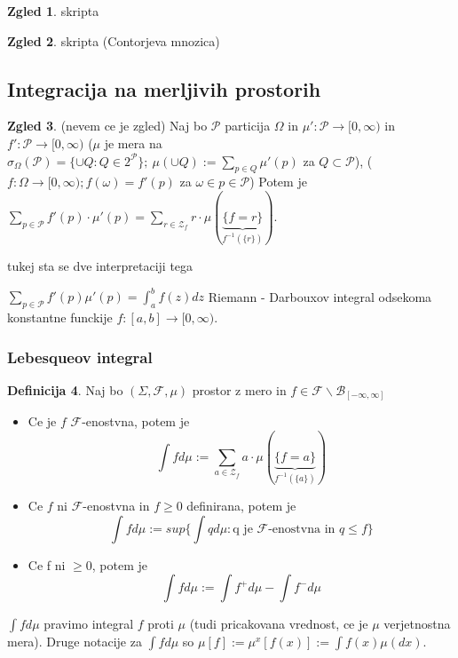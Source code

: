 \documentclass[a4paper,12pt]{article}
\theoremstyle{definition} %
\newtheorem{definicija}{Definicija}[section]
\newtheorem{zgled}[definicija]{Zgled}
\theoremstyle{plain} %
\newcommand{\F}{\mathcal{F}}
\begin{document}
            \begin{zgled}
                skripta
            \end{zgled}

            \begin{zgled}
                skripta (Contorjeva mnozica)
            \end{zgled}

    \subsection{Integracija na merljivih prostorih}
        \begin{zgled}(nevem ce je zgled)
            Naj bo $\mathcal{P}$ particija $\Omega$ in $\mu':\mathcal{P} \rightarrow [0, \infty)$ in
            $f':\mathcal{P} \rightarrow [0, \infty)$ ($\mu$ je mera na $\sigma_\Omega(\mathcal{P})=\{\cup Q: Q \in 2^{\mathcal{P}}\}; \ 
            \mu(\cup Q):= \sum_{p \in Q}\mu'(p)$ za $Q \subset \mathcal{P}$), ($f:\Omega \rightarrow [0, \infty); f(\omega) = f'(p)$ za $\omega \in p \in \mathcal{P}$)
            Potem je $\sum_{p \in \mathcal{P}}f'(p)\cdot\mu'(p) = \sum_{r \in \mathcal{Z}_f}r\cdot\mu(\underbrace{\{f = r\}}_{f^{-1}(\{r\})})$.

            tukej sta se dve interpretaciji tega
        \end{zgled}

        $\sum_{p \in \mathcal{P}}f'(p)\mu'(p) = \int_a^bf(z)dz$ Riemann - Darbouxov integral odsekoma konstantne funckije 
        $f: [a, b] \rightarrow [0, \infty)$.

        \subsubsection{Lebesqueov integral}
            \begin{definicija}
                Naj bo $(\Sigma, \F, \mu)$ prostor z mero in $f \in \F\backslash\mathcal{B}_{[-\infty, \infty]}$
                \begin{itemize}
                    \item Ce je $f$ $\F$-enostvna, potem je
                    $$
                        \int fd\mu := \sum_{a \in \mathcal{Z}_f}a\cdot\mu(\underbrace{\{f = a\}}_{f^{-1}(\{a\})})
                    $$
                    \item Ce $f$ ni $\F$-enostvna in $f \geq 0$ definirana, potem je
                    $$
                        \int fd\mu := sup\{\int qd\mu: \text{q je $\F$-enostvna in $q  \leq f$}\}
                    $$
                    \item Ce f ni $\geq 0$, potem je 
                    $$
                        \int fd\mu := \int f^+d\mu - \int f^-d\mu
                    $$
                \end{itemize}
                $\int fd\mu$ pravimo integral $f$ proti $\mu$ (tudi pricakovana vrednost, ce je $\mu$ verjetnostna mera).
                Druge notacije za $\int fd\mu$ so $\mu[f]:=\mu^x[f(x)]:=\int f(x)\mu(dx).$
            \end{definicija}
\end{document}
